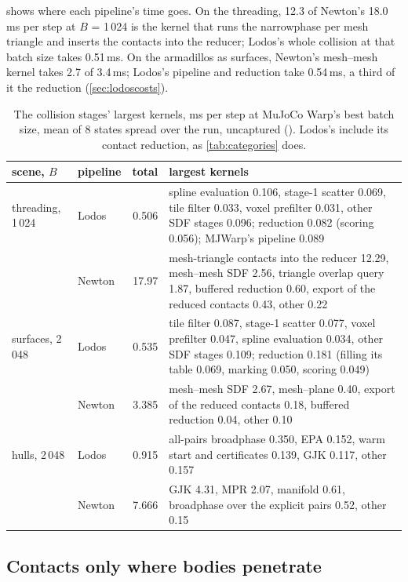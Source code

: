  shows where each pipeline's time goes. On the threading, 12.3 of Newton's 18.0\,ms per step at $B$ = 1\,024 is the kernel that runs the narrowphase per mesh triangle and inserts the contacts into the reducer; Lodos's whole collision at that batch size takes 0.51\,ms. On the armadillos as surfaces, Newton's mesh--mesh kernel takes 2.7 of 3.4\,ms; Lodos's pipeline and reduction take 0.54\,ms, a third of it the reduction (\cref{sec:lodoscosts}).

\begin{table}[t]
\centering
\caption{The collision stages' largest kernels, ms per step at MuJoCo Warp's best batch size, mean of 8 states spread over the run, uncaptured (). Lodos's include its contact reduction, as \cref{tab:categories} does.}
\label{tab:collkernels}
\small
\begin{tabularx}{\linewidth}{@{}L{25mm}L{18mm}rY@{}}
\toprule
scene, $B$ & pipeline & total & largest kernels \\
\midrule
threading, 1\,024 & Lodos & 0.506 & spline evaluation 0.106, stage-1 scatter 0.069, tile filter 0.033, voxel prefilter 0.031, other SDF stages 0.096; reduction 0.082 (scoring 0.056); MJWarp's pipeline 0.089 \\
& Newton & 17.97 & mesh-triangle contacts into the reducer 12.29, mesh--mesh SDF 2.56, triangle overlap query 1.87, buffered reduction 0.60, export of the reduced contacts 0.43, other 0.22 \\
\midrule
surfaces, 2\,048 & Lodos & 0.535 & tile filter 0.087, stage-1 scatter 0.077, voxel prefilter 0.047, spline evaluation 0.034, other SDF stages 0.109; reduction 0.181 (filling its table 0.069, marking 0.050, scoring 0.049) \\
& Newton & 3.385 & mesh--mesh SDF 2.67, mesh--plane 0.40, export of the reduced contacts 0.18, buffered reduction 0.04, other 0.10 \\
\midrule
hulls, 2\,048 & Lodos & 0.915 & all-pairs broadphase 0.350, EPA 0.152, warm start and certificates 0.139, GJK 0.117, other 0.157 \\
& Newton & 7.666 & GJK 4.31, MPR 2.07, manifold 0.61, broadphase over the explicit pairs 0.52, other 0.15 \\
\bottomrule
\end{tabularx}
\end{table}

\subsection{Contacts only where bodies penetrate}\label{sec:gap}

